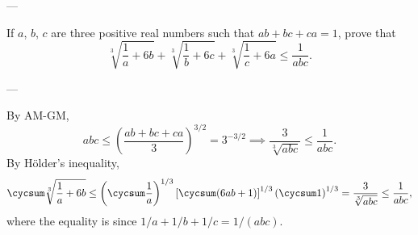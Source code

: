 
---

If $a$, $b$, $c$ are three positive real numbers such that $ab+bc+ca=1$, prove that \[\sqrt[3]{\frac1a+6b}+\sqrt[3]{\frac1b+6c}+\sqrt[3]{\frac1c+6a}\le\frac1{abc}.\]

---

By AM-GM, \[abc\le\left(\frac{ab+bc+ca}3\right)^{3/2}=3^{-3/2}\implies\frac3{\sqrt[3]{abc}}\le\frac1{abc}.\]
By H\"older's inequality, \[\cycsum\sqrt[3]{\frac1a+6b}\le\left(\cycsum\frac1a\right)^{1/3}\left[\cycsum(6ab+1)\right]^{1/3}\left(\cycsum1\right)^{1/3}=\frac3{\sqrt[3]{abc}}\le\frac1{abc},\]
where the equality is since $1/a+1/b+1/c=1/(abc)$.
